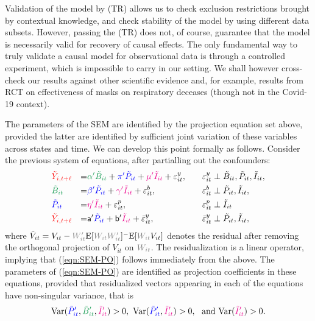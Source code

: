 \documentclass[11pt,reqno,letter]{amsart}
\theoremstyle{definition}
\providecommand{\Var}{{\mathrm{Var}}}
\newcommand{\Ep}{{\mathrm{E}}}
\def\bcolor{\color{ForestGreen}}
\def\pcolor{\color{blue}}
\def\icolor{\color{magenta}}
\def\wcolor{\color{gray}}
\def\ycolor{\color{red}}
\begin{document}
Validation of the model by (TR) allows us to check exclusion restrictions brought by contextual knowledge,
and check stability of the model by using different data subsets.  However, passing the (TR) does
not, of course, guarantee that the model is necessarily valid for recovery of causal effects. The only fundamental way to truly validate a causal model for observational data is through a controlled experiment, which is impossible to carry  in our setting. We shall however cross-check our results against other scientific evidence and, for example, results from RCT on effectiveness of masks on respiratory deceases (though not in the Covid-19 context).

The parameters of the SEM are identified by the projection equation set above, provided the latter are identified by sufficient joint variation of these variables across states and time. We can develop this point formally as follows. Consider the previous system of equations, after partialling out the confounders:
\begin{equation}\label{eqn:SEM-PO}
 \begin{aligned}
   & {\ycolor { \tilde Y_{i,t+\ell}}}  & =& {\bcolor {\alpha ' \tilde B_{it}}} +{\pcolor {\pi '\tilde P_{it}}} +{\icolor \mu'\tilde I_{it} } + \varepsilon^y_{it},&\varepsilon^y_{it} &\perp {\tilde B_{it}}, {\tilde  P_{it}}, { \tilde I_{it}},  \\
   & {\bcolor { \tilde B_{it}}} & = &{\pcolor { \beta' \tilde P_{it}} } + {\icolor { \gamma' \tilde I_{it}} } + \varepsilon^b_{it},
   &\quad \varepsilon^b_{it} &\perp { \tilde P_{it}}, { \tilde I_{it}},  \\
   & {\pcolor { \tilde P_{it}} } &= &  {\icolor {\eta' \tilde I_{it}} } +   \varepsilon^p_{it}, &\quad \varepsilon^p_{it} &\perp {\tilde I_{it}}  \\
     & {\ycolor { \tilde Y_{i,t+\ell}}}  & =&  \mathsf{a} ' {\pcolor {\tilde P_{it}}} + \mathsf{b}' {\icolor \tilde I_{it} } + \bar \varepsilon^y_{it},&\bar \varepsilon^y_{it} &\perp  {\tilde  P_{it}}, { \tilde I_{it}},  \\
   \end{aligned}
\end{equation}
where $ \tilde V_{it} = V_{it}   -     {\wcolor W_{it}'} \Ep[{\wcolor W_{it}W_{it}'}]^{-} \Ep[{\wcolor W_{it}} V_{it}]$ denotes
the residual after removing the orthogonal projection of $V_{it}$ on ${\wcolor W_{it}}$. The residualization is a linear operator, implying that (\ref{eqn:SEM-PO}) follows immediately from the above. The parameters of (\ref{eqn:SEM-PO})  are identified as projection coefficients in these equations, provided that residualized vectors appearing in each of the equations have non-singular variance, that is
 \begin{equation}
 \Var ( {\pcolor \tilde P_{it}'} ,{\bcolor \tilde B_{it}'},{\icolor \tilde I_{it}'})>0,
 \ \Var ({\pcolor \tilde P_{it}'}, {\icolor \tilde I_{it}'})> 0 , \ \text{ and  }  \Var ( {\icolor \tilde I_{it}'}) >0.
 \end{equation}
\end{document}
